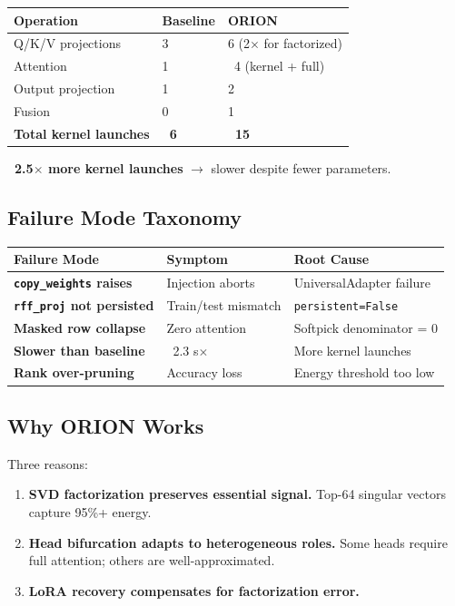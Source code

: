 \begin{table}[H]
\centering
\small
\begin{tabular}{lll}
\toprule
\textbf{Operation} & \textbf{Baseline} & \textbf{ORION} \\
\midrule
Q/K/V projections & 3 & 6 (2$\times$ for factorized) \\
Attention & 1 & ~4 (kernel + full) \\
Output projection & 1 & 2 \\
Fusion & 0 & 1 \\
\textbf{Total kernel launches} & \textbf{~6} & \textbf{~15} \\
\bottomrule
\end{tabular}
\end{table}

\textbf{~2.5$\times$ more kernel launches} $\to$ slower despite fewer parameters.

\subsection{Failure Mode Taxonomy}

\begin{table}[H]
\centering
\small
\begin{tabular}{lll}
\toprule
\textbf{Failure Mode} & \textbf{Symptom} & \textbf{Root Cause} \\
\midrule
\textbf{\texttt{copy\_weights} raises} & Injection aborts & UniversalAdapter failure \\
\textbf{\texttt{rff\_proj} not persisted} & Train/test mismatch & \texttt{persistent=False} \\
\textbf{Masked row collapse} & Zero attention & Softpick denominator = 0 \\
\textbf{Slower than baseline} & ~2.3 s$\times$ & More kernel launches \\
\textbf{Rank over-pruning} & Accuracy loss & Energy threshold too low \\
\bottomrule
\end{tabular}
\end{table}

\subsection{Why ORION Works}

Three reasons:

\begin{enumerate}
\item \textbf{SVD factorization preserves essential signal.} Top-64 singular
  vectors capture 95\%+ energy.
\item \textbf{Head bifurcation adapts to heterogeneous roles.} Some heads
  require full attention; others are well-approximated.
\item \textbf{LoRA recovery compensates for factorization error.}

\end{enumerate}
